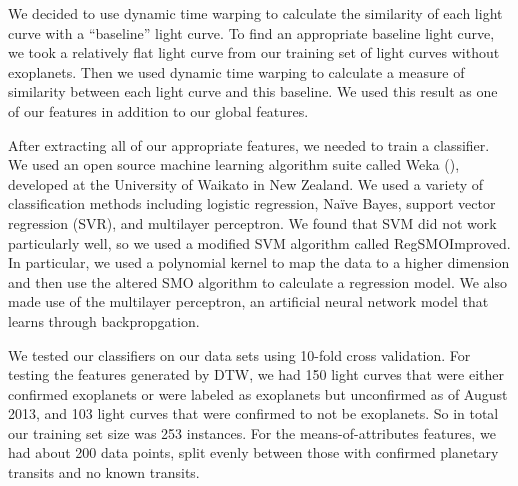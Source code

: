\documentclass{amsart}
\begin{document}
We decided to use dynamic time warping to calculate the similarity of each light curve with a ``baseline'' light curve. To find an appropriate baseline light curve, we took a relatively flat light curve from our training set of light curves without exoplanets. Then we used dynamic time warping to calculate a measure of similarity between each light curve and this baseline. We used this result as one of our features in addition to our global features.

After extracting all of our appropriate features, we needed to train a classifier. We used an open source machine learning algorithm suite called Weka (\cite{Weka}), developed at the University of Waikato in New Zealand. We used a variety of classification methods including logistic regression, Na\"ive Bayes, support vector regression (SVR), and multilayer perceptron. We found that SVM did not work particularly well, so we used a modified SVM algorithm called RegSMOImproved\cite{SMOreg}. In particular, we used a polynomial kernel to map the data to a higher dimension and then use the altered SMO algorithm to calculate a regression model. We also made use of the multilayer perceptron, an artificial neural network model that learns through backpropgation. 

We tested our classifiers on our data sets using 10-fold cross validation. For testing the features generated by DTW, we had 150 light curves that were either confirmed exoplanets or were labeled as exoplanets but unconfirmed as of August 2013, and 103 light curves that were confirmed to not be exoplanets. So in total our training set size was 253 instances. For the means-of-attributes features, we had about 200 data points, split evenly between those with confirmed planetary transits and no known transits.

\end{document}
